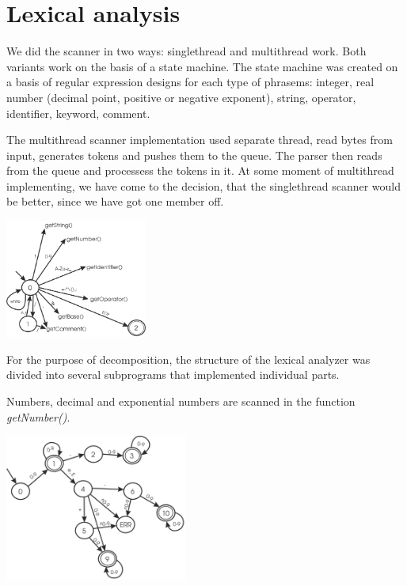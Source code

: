 \documentclass[10pt,a4paper,titlepage]{article}
\begin{document}
\section{Lexical analysis}

\begin{justify}
We did the scanner in two ways: singlethread and multithread work. Both variants work on the basis of a state machine.
The state machine was created on a basis of regular expression designs for each type of phrasems:
integer, real number (decimal point, positive or negative exponent), string, operator, identifier, keyword, comment.

The multithread scanner implementation used separate thread, read bytes from input, generates tokens and pushes
them to the queue. The parser then reads from the queue and processess the tokens in it. At some moment of multithread
implementing, we have come to the decision, that the singlethread scanner would be better, since we have got one member off.

\begin{center}
  \includegraphics[width=0.35\textwidth]{img/general.png}
\end{center}

For the purpose of decomposition, the structure of the lexical analyzer was divided into several subprograms
that implemented individual parts.
\end{justify}

\begin{justify}
Numbers, decimal and exponential numbers are scanned in the function \textit{getNumber()}.
\end{justify}
\begin{center}
  \includegraphics[width=0.45\textwidth]{img/getNumber.png}
\end{center}
\end{document}
